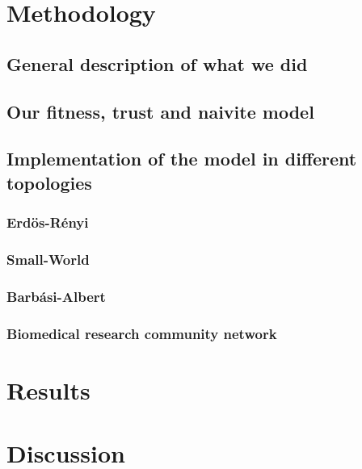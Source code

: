 \section{Methodology}
\label{sec:2}

\subsection{General description of what we did}

\subsection{Our fitness, trust and naivite model}

\subsection{Implementation of the model in different topologies}

\subsubsection{Erd\"{o}s-R\'enyi}

\subsubsection{Small-World}

\subsubsection{Barbási-Albert}

\subsubsection{Biomedical research community network}


\section{Results}
\label{sec:3}



\section{Discussion}
\label{sec:4}



